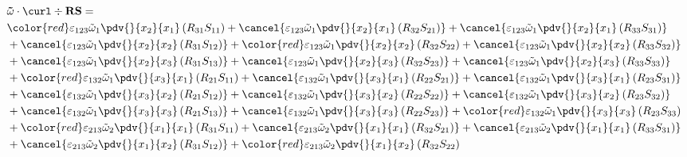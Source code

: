 \begin{equation}
	\begin{split}
&\mathbf{\tilde{\omega}}\cdot\curl \div \mathbf{RS} = \\&{\color{red}\varepsilon_{123}\tilde{\omega}_{1}\pdv{}{x_{2}}{x_{1}}\left(R_{31}S_{11}\right)}
		+\cancel{\varepsilon_{123}\tilde{\omega}_{1}\pdv{}{x_{2}}{x_{1}}\left(R_{32}S_{21}\right)}
		+\cancel{\varepsilon_{123}\tilde{\omega}_{1}\pdv{}{x_{2}}{x_{1}}\left(R_{33}S_{31}\right)}\\
&		+\cancel{\varepsilon_{123}\tilde{\omega}_{1}\pdv{}{x_{2}}{x_{2}}\left(R_{31}S_{12}\right)}
		+{\color{red}\varepsilon_{123}\tilde{\omega}_{1}\pdv{}{x_{2}}{x_{2}}\left(R_{32}S_{22}\right)}
		+\cancel{\varepsilon_{123}\tilde{\omega}_{1}\pdv{}{x_{2}}{x_{2}}\left(R_{33}S_{32}\right)}\\
&		+\cancel{\varepsilon_{123}\tilde{\omega}_{1}\pdv{}{x_{2}}{x_{3}}\left(R_{31}S_{13}\right)}
		+\cancel{\varepsilon_{123}\tilde{\omega}_{1}\pdv{}{x_{2}}{x_{3}}\left(R_{32}S_{23}\right)}
		+\cancel{\varepsilon_{123}\tilde{\omega}_{1}\pdv{}{x_{2}}{x_{3}}\left(R_{33}S_{33}\right)}\\
&		+{\color{red}\varepsilon_{132}\tilde{\omega}_{1}\pdv{}{x_{3}}{x_{1}}\left(R_{21}S_{11}\right)}
		+\cancel{\varepsilon_{132}\tilde{\omega}_{1}\pdv{}{x_{3}}{x_{1}}\left(R_{22}S_{21}\right)}
		+\cancel{\varepsilon_{132}\tilde{\omega}_{1}\pdv{}{x_{3}}{x_{1}}\left(R_{23}S_{31}\right)}\\
&		+\cancel{\varepsilon_{132}\tilde{\omega}_{1}\pdv{}{x_{3}}{x_{2}}\left(R_{21}S_{12}\right)}
		+\cancel{\varepsilon_{132}\tilde{\omega}_{1}\pdv{}{x_{3}}{x_{2}}\left(R_{22}S_{22}\right)}
		+\cancel{\varepsilon_{132}\tilde{\omega}_{1}\pdv{}{x_{3}}{x_{2}}\left(R_{23}S_{32}\right)}\\
&		+\cancel{\varepsilon_{132}\tilde{\omega}_{1}\pdv{}{x_{3}}{x_{3}}\left(R_{21}S_{13}\right)}
		+\cancel{\varepsilon_{132}\tilde{\omega}_{1}\pdv{}{x_{3}}{x_{3}}\left(R_{22}S_{23}\right)}
		+{\color{red}\varepsilon_{132}\tilde{\omega}_{1}\pdv{}{x_{3}}{x_{3}}\left(R_{23}S_{33}\right)}\\
&		+{\color{red}\varepsilon_{213}\tilde{\omega}_{2}\pdv{}{x_{1}}{x_{1}}\left(R_{31}S_{11}\right)}
		+\cancel{\varepsilon_{213}\tilde{\omega}_{2}\pdv{}{x_{1}}{x_{1}}\left(R_{32}S_{21}\right)}
		+\cancel{\varepsilon_{213}\tilde{\omega}_{2}\pdv{}{x_{1}}{x_{1}}\left(R_{33}S_{31}\right)}\\
&		+\cancel{\varepsilon_{213}\tilde{\omega}_{2}\pdv{}{x_{1}}{x_{2}}\left(R_{31}S_{12}\right)}
		+{\color{red}\varepsilon_{213}\tilde{\omega}_{2}\pdv{}{x_{1}}{x_{2}}\left(R_{32}S_{22}\right)}

\end{split}
\end{equation}
